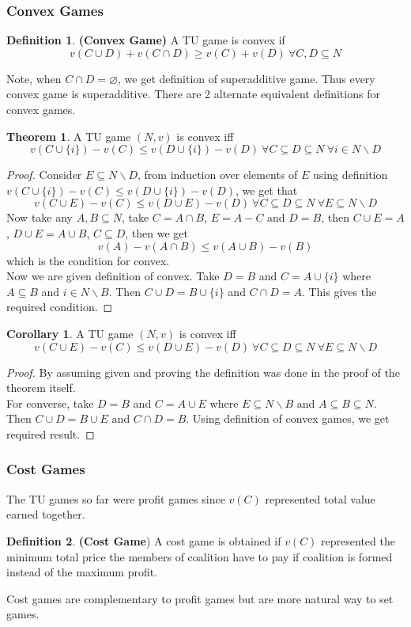 \documentclass{article}
\theoremstyle{definition}
\newtheorem{theorem}{Theorem}[section]
\newtheorem{cor}{Corollary}[theorem]
\newtheorem{defn}{Definition}[section]
\begin{document}
\subsubsection{Convex Games}
\begin{defn}
\textbf{(Convex Game)} A TU game is convex if $$v(C\cup D) + v(C\cap D) \geq v(C) + v(D) ~\forall C,D \subseteq N$$
\end{defn}
Note, when $C \cap D = \varnothing$, we get definition of superadditive game. Thus every convex game is superadditive. There are 2 alternate equivalent definitions for convex games.
\begin{theorem}
\label{conv alt defn}
A TU game $(N,v)$ is convex iff $$v(C \cup \{i\}) - v(C) \leq v(D \cup \{i\}) - v(D) ~\forall C\subseteq D \subseteq N ~\forall i \in N\backslash D$$
\end{theorem}
\begin{proof}
Consider $E \subseteq N\backslash D$, from induction over elements of $E$ using definition $v(C \cup \{i\}) - v(C) \leq v(D \cup \{i\}) - v(D)$, we get that $$v(C \cup E) - v(C) \leq v(D \cup E) - v(D)~\forall C\subseteq D\subseteq N~\forall E \subseteq N\backslash D$$
Now take any $A,B \subseteq N$, take $C = A \cap B$, $E = A - C$ and $D = B$, then $C\cup E = A$, $D \cup E = A \cup B$, $C \subseteq D$, then we get $$v(A) - v(A\cap B) \leq v(A \cup B) - v(B)$$ which is the condition for convex.\\
Now we are given definition of convex. Take $D = B$ and $C = A\cup \{i\}$ where $A \subseteq B$ and $ i \in N\backslash B$. Then $C\cup D = B\cup \{i\}$ and $C\cap D = A$. This gives the required condition.
\end{proof}
\begin{cor}
A TU game $(N,v)$ is convex iff $$v(C \cup E) - v(C) \leq v(D \cup E) - v(D)~\forall C\subseteq D\subseteq N~\forall E \subseteq N\backslash D$$
\end{cor}
\begin{proof}
By assuming given and proving the definition was done in the proof of the theorem itself.\\
For converse, take $D = B$ and $C = A \cup E$ where $E \subseteq N\backslash B$ and $A\subseteq B \subseteq N$. Then $C\cup D = B \cup E$ and $C\cap D = B$. Using definition of convex games, we get required result.
\end{proof}
\subsubsection{Cost Games}
The TU games so far were profit games since $v(C)$ represented total value earned together. 
\begin{defn}
\textbf{(Cost Game}) A cost game is obtained if $v(C)$ represented the minimum total price the members of coalition have to pay if coalition is formed instead of the maximum profit.
\end{defn}
Cost games are complementary to profit games but are more natural way to set games.
\end{document}
